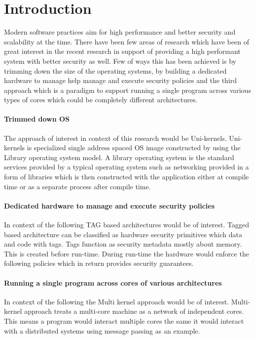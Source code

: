 
\chapter{Introduction}  %
Modern software practices aim for high performance and better security
and scalability at the time. There have been few areas of research 
which have been of great interest in the recent research in support 
of providing a high performant system with better security as well.
Few of ways this has been achieved is by trimming down the size of 
the operating systems, by building a dedicated hardware to manage 
help manage and execute security policies and the third approach 
which is a paradigm to support running a single program across 
various types of cores which could be completely different 
architectures.

\subsubsection{Trimmed down OS}
The approach of interest in context of this research would 
be Uni-kernels. Uni-kernels is specialized single address 
spaced OS image constructed by using the Library operating 
system model. A library operating system is the standard services 
provided by a typical operating system such as networking provided 
in a form of libraries which is then constructed with the application 
either at compile time or as a separate process after compile time.

\subsubsection{Dedicated hardware to manage and execute security
policies}
In context of the following TAG based architectures would be 
of interest. Tagged based architecture can be classified as 
hardware security primitives which data and code with tags. 
Tags function as security metadata mostly about memory. This is
created before run-time. During run-time the hardware 
would enforce the following policies which in return 
provides security guarantees. 

\subsubsection{Running a single program across cores of 
various architectures}
In context of the following the Multi kernel approach would 
be of interest. Multi-kernel approach treats a multi-core machine 
as a network of independent cores. This means a program would interact
multiple cores the same it would interact with a distributed systems 
using message passing as an example. 

